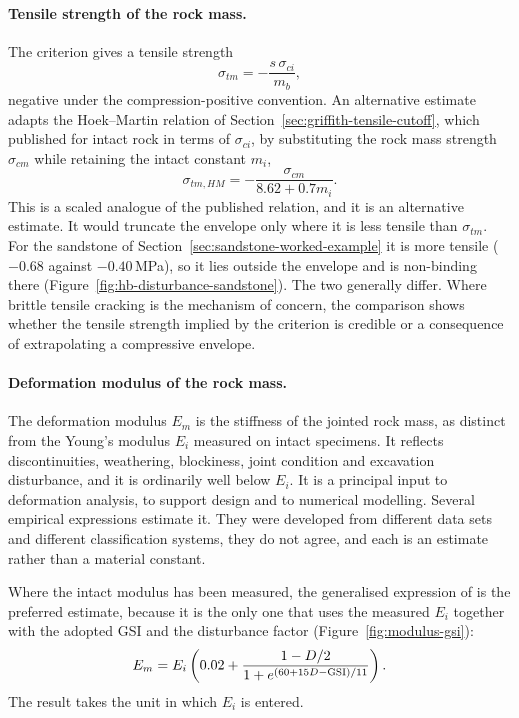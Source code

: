 \paragraph{Tensile strength of the rock mass.}
The criterion gives a tensile strength
\[
\sigma_{tm}
=
-\frac{s\,\sigma_{ci}}{m_b} ,
\]
negative under the compression-positive convention. An alternative estimate
adapts the Hoek--Martin relation of
Section~\ref{sec:griffith-tensile-cutoff}, which \citet{hoekmartin2014fracture}
published for intact rock in terms of \(\sigma_{ci}\), by substituting the
rock mass strength \(\sigma_{cm}\) while retaining the intact constant
\(m_i\),
\[
\sigma_{tm,HM}
=
-\frac{\sigma_{cm}}{8.62+0.7m_i} .
\]
This is a scaled analogue of the published relation, and it is an
alternative estimate. It would truncate the
envelope only where it is less tensile than \(\sigma_{tm}\). For the
sandstone of Section~\ref{sec:sandstone-worked-example} it is more tensile
(\(-0.68\) against \(-0.40\)\,MPa), so it lies outside the envelope and is
non-binding there (Figure~\ref{fig:hb-disturbance-sandstone}).
The two generally differ. Where brittle
tensile cracking is the mechanism of concern, the comparison shows whether the
tensile strength implied by the criterion is credible or a consequence
of extrapolating a compressive envelope.

\paragraph{Deformation modulus of the rock mass.}
The deformation modulus \(E_m\) is the stiffness of the jointed rock mass, as
distinct from the Young's modulus \(E_i\) measured on intact specimens. It
reflects discontinuities, weathering, blockiness, joint condition and
excavation disturbance, and it is ordinarily well below \(E_i\). It is a
principal input to deformation analysis, to support design and to numerical
modelling. Several empirical expressions estimate it. They were developed
from different data sets and different classification systems, they do not
agree, and each is an estimate rather than a material constant.

Where the intact modulus has been measured, the generalised expression of
\citet{hoekdiederichs2006} is the preferred estimate, because it is the only
one that uses the measured \(E_i\) together with the adopted GSI and the
disturbance factor (Figure~\ref{fig:modulus-gsi}):
\[
E_m =
E_i
\left(
0.02+
\frac{1-D/2}
{1+e^{(60+15D-\mathrm{GSI})/11}}
\right) .
\]
The result takes the unit in which \(E_i\) is entered.

